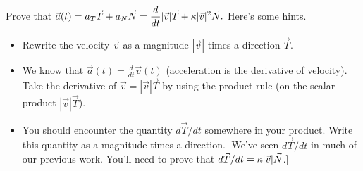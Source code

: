 \begin{problem}%
 Prove that $\displaystyle \vec a(t) = a_T\vec T+a_N\vec N=\frac{d}{dt}|\vec v| \vec T + \kappa |\vec v|^2 \vec N.$ Here's some hints.
\begin{itemize}
 \item Rewrite the velocity $\vec v$ as a magnitude $|\vec v|$ times a direction $\vec T$.  
 \item We know that $\vec a(t) = \frac{d}{dt}\vec v(t)$ (acceleration is the derivative of velocity). Take the derivative of $\vec v = |\vec v|\vec T$ by using the product rule (on the scalar product $|\vec v|\vec T$).
 \item You should encounter the quantity $d\vec T/dt$ somewhere in your product. Write this quantity as a magnitude times a direction. [We've seen $d\vec T/dt$ in much of our previous work. You'll need to prove that $\displaystyle d\vec T/dt=\kappa|\vec v|\vec N$.]
\end{itemize}
\end{problem}

